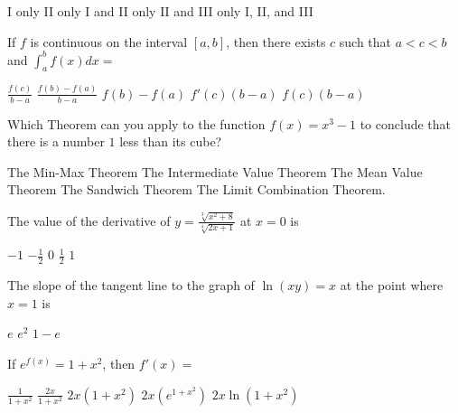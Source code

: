 \begin{questions}
    \begin{oneparchoices}
    \choice I only
    \choice II only
    \choice I and II only
    \choice II and III only
    \CorrectChoice I, II, and III
    \end{oneparchoices}


\question[2] If $f$ is continuous on the interval $[a, b]$, then there
    exists $c$ such that $a < c< b$ and $\int_a^b f(x)dx = $

    \begin{oneparchoices}
    \choice $\frac{f(c)}{b - a}$
    \choice $\frac{f(b) - f(a)}{b - a}$
    \choice $f(b) - f(a)$
    \choice $f'(c)(b - a)$
    \CorrectChoice $f(c)(b - a)$
    \end{oneparchoices}

\question[2] Which Theorem can you apply to the function $f(x) = x^3 -
    1$ to conclude that there is a number $1$ less than its cube?
    \begin{oneparchoices}
    \choice The Min-Max Theorem
    \CorrectChoice The Intermediate Value Theorem
    \choice The Mean Value Theorem
    \choice The Sandwich Theorem
    \choice The Limit Combination Theorem.
    \end{oneparchoices}

\question[2] The value of the derivative of $y = \frac{\sqrt[3]{x^2 +
    8}}{\sqrt[4]{2x + 1}}$ at $x = 0$ is

    \begin{oneparchoices}
    \CorrectChoice $-1$
    \choice $-\frac{1}{2}$
    \choice $0$
    \choice $\frac{1}{2}$
    \choice $1$
    \end{oneparchoices}

\question[2] The slope of the tangent line to the graph of $\ln(xy) =
    x$ at the point where $x = 1$ is

    \begin{oneparchoices}
    \choice $e$
    \choice $e^2$
    \choice $1 - e$
    \end{oneparchoices}

\question[2] If $e^{f(x)} = 1 + x^2$, then $f'(x) = $

    \begin{oneparchoices}
    \choice $\frac{1}{1 + x^2}$
    \CorrectChoice $\frac{2x}{1 + x^2}$
    \choice $2x(1 + x^2)$
    \choice $2x(e^{1 + x^2})$
    \choice $2x\ln(1 + x^2)$
    \end{oneparchoices}


\end{questions}
